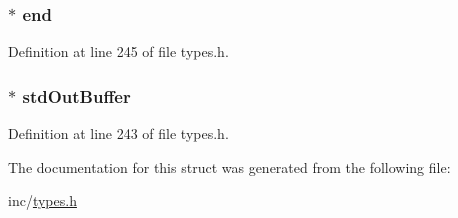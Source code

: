 \hypertarget{structstd_out_t_t_y_a69c1bb32d9b06f32161aff7f1c822c97}{
\subsubsection[{end}]{$\ast$ {\bf end}}}
\label{structstd_out_t_t_y_a69c1bb32d9b06f32161aff7f1c822c97}


Definition at line 245 of file types.h.

\hypertarget{structstd_out_t_t_y_aef253d03c960d4ee76bc0f0f84236f8b}{
\subsubsection[{stdOutBuffer}]{$\ast$ {\bf stdOutBuffer}}}
\label{structstd_out_t_t_y_aef253d03c960d4ee76bc0f0f84236f8b}


Definition at line 243 of file types.h.



The documentation for this struct was generated from the following file:\begin{DoxyCompactItemize}
\item 
inc/\hyperlink{types_8h}{types.h}\end{DoxyCompactItemize}
